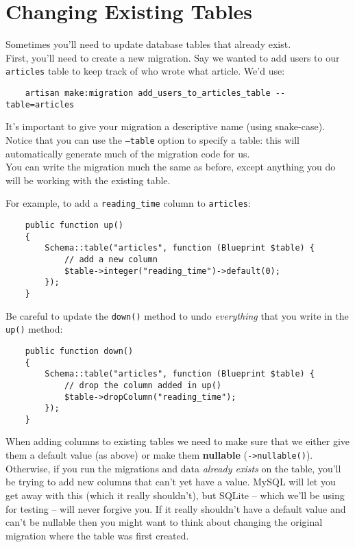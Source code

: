 \section{Changing Existing Tables}

Sometimes you'll need to update database tables that already exist.
\\

First, you'll need to create a new migration. Say we wanted to add users to our \texttt{articles} table to keep track of who wrote what article. We'd use:

\begin{verbatim}
    artisan make:migration add_users_to_articles_table --table=articles
\end{verbatim}

It's important to give your migration a descriptive name (using snake-case). Notice that you can use the \texttt{--table} option to specify a table: this will automatically generate much of the migration code for us.
\\

You can write the migration much the same as before, except anything you do will be working with the existing table.

\pagebreak

For example, to add a \texttt{reading\_time} column to \texttt{articles}:

\begin{verbatim}
    public function up()
    {
        Schema::table("articles", function (Blueprint $table) {
            // add a new column
            $table->integer("reading_time")->default(0);
        });
    }
\end{verbatim}

Be careful to update the \texttt{down()} method to undo \textit{everything} that you write in the \texttt{up()} method:

\begin{verbatim}
    public function down()
    {
        Schema::table("articles", function (Blueprint $table) {
            // drop the column added in up()
            $table->dropColumn("reading_time");
        });
    }
\end{verbatim}

When adding columns to existing tables we need to make sure that we either give them a default value (as above) or make them \textbf{nullable} (\texttt{->nullable()}). Otherwise, if you run the migrations and data \textit{already exists} on the table, you'll be trying to add new columns that can't yet have a value. MySQL will let you get away with this (which it really shouldn't), but SQLite – which we'll be using for testing – will never forgive you. If it really shouldn't have a default value and can't be nullable then you might want to think about changing the original migration where the table was first created.


